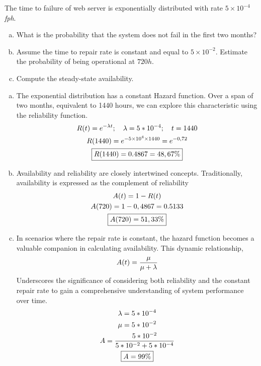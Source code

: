 \documentclass{article}
\begin{document}
\begin{question}
	The time to failure of web server is exponentially distributed with rate \( 5 \times 10^{-4} \) \textit{fph}. 
    \begin{enumerate}[(a)]
    \item What is the probability that the system does not fail in the first two months? 
    \item Assume the time to repair rate is constant and equal to \( 5 \times 10^{-2} \). Estimate the probability of being operational at \( 720h \).
    \item Compute the steady-state availability.
    \end{enumerate}
\end{question}

\begin{enumerate}[(a)]
    \item The exponential distribution has a constant Hazard function. Over a span of two months, equivalent to 1440 hours, we can explore this characteristic using the reliability function.
\begin{gather*}
    R(t) = e^{-\lambda t};\quad \lambda = 5*10^{-4};\quad   t = 1440 \\
    R(1440) = e^{-5 \times 10^4 \times 1440} = e^{-0,72} \\
    \fbox{$R(1440) = 0.4867 = 48,67\%$}
\end{gather*}
    \item Availability and reliability are closely intertwined concepts. Traditionally, availability is expressed as the complement of reliability
\begin{gather*}
    A(t) = 1 - R(t) \\
    A(720) = 1 - 0,4867 = 0.5133 \\
    \fbox{$A(720) = 51,33\%$}
\end{gather*}
    \item In scenarios where the repair rate is constant, the hazard function becomes a valuable companion in calculating availability. This dynamic relationship,
 \begin{equation}
     A(t) = \frac{\mu}{\mu + \lambda} \notag
 \end{equation}
Underscores the significance of considering both reliability and the constant repair rate to gain a comprehensive understanding of system performance over time.
\begin{gather*}
    \lambda = 5 * 10^{-4} \\ 
    \mu = 5 * 10^{-2} \\
    A = \frac{5 * 10^{-2}}{5 * 10^{-2} + 5 * 10^{-4}} \\
    \fbox{$A = 99\%$}
\end{gather*}

\end{enumerate}
\newpage
\end{document}
